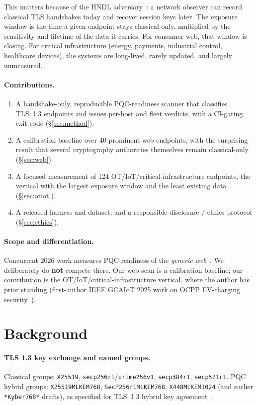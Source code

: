 \documentclass[11pt]{article}
\newcommand{\code}[1]{\texttt{#1}}
\begin{document}
This matters because of the HNDL adversary~\cite{mosca2018}: a network observer can
record classical TLS handshakes today and recover session keys later. The exposure
window is the time a given endpoint stays classical-only, multiplied by the sensitivity
and lifetime of the data it carries. For consumer web, that window is closing. For
critical infrastructure (energy, payments, industrial control, healthcare devices),
the systems are long-lived, rarely updated, and largely unmeasured.

\paragraph{Contributions.}
\begin{enumerate}
  \item A handshake-only, reproducible PQC-readiness scanner that classifies TLS~1.3
        endpoints and issues per-host and fleet verdicts, with a CI-gating exit code
        (\S\ref{sec:method}).
  \item A calibration baseline over 40 prominent web endpoints, with the surprising
        result that several cryptography authorities themselves remain classical-only
        (\S\ref{sec:web}).
  \item A focused measurement of 124 OT/IoT/critical-infrastructure endpoints, the
        vertical with the largest exposure window and the least existing data
        (\S\ref{sec:otiot}).
  \item A released harness and dataset, and a responsible-disclosure / ethics protocol
        (\S\ref{sec:ethics}).
\end{enumerate}

\paragraph{Scope and differentiation.}
Concurrent 2026 work measures PQC readiness of the \emph{generic
web}~\cite{ibrahim2026raw,delgado2026observability}. We deliberately do \textbf{not}
compete there. Our web scan is a calibration baseline; our contribution
is the OT/IoT/critical-infrastructure vertical, where the author has prior standing
(first-author IEEE GCAIoT 2025 work on OCPP EV-charging security~\cite{shaik2025ocpp}).

\section{Background}

\paragraph{TLS 1.3 key exchange and named groups.}
Classical groups: \code{X25519}, \code{secp256r1}/\code{prime256v1}, \code{secp384r1},
\code{secp521r1}. PQC hybrid groups: \code{X25519MLKEM768}, \code{SecP256r1MLKEM768},
\code{X448MLKEM1024} (and earlier \code{*Kyber768*} drafts), as specified for TLS~1.3
hybrid key agreement~\cite{ietfmlkem}.
\end{document}
